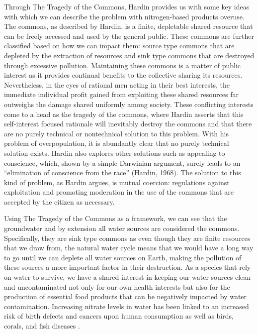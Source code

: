 \documentclass[12pt]{article}
\begin{document}
	Through The Tragedy of the Commons, Hardin provides us with some key ideas with which we can describe the problem with nitrogen-based products overuse. The commons, as described by Hardin, is a finite, depletable shared resource that can be freely accessed and used by the general public. These commons are further classified based on how we can impact them: source type commons that are depleted by the extraction of resources and sink type commons that are destroyed through excessive pollution. Maintaining these commons is a matter of public interest as it provides continual benefits to the collective sharing its resources. Nevertheless, in the eyes of rational men acting in their best interests, the immediate individual profit gained from exploiting these shared resources far outweighs the damage shared uniformly among society. These conflicting interests come to a head as the tragedy of the commons, where Hardin asserts that this self-interest focused rationale will inevitably destroy the commons and that there are no purely technical or nontechnical solution to this problem. With his problem of overpopulation, it is abundantly clear that no purely technical solution exists. Hardin also explores other solutions such as appealing to conscience, which, shown by a simple Darwinian argument, surely leads to an “elimination of conscience from the race” (Hardin, 1968). The solution to this kind of problem, as Hardin argues, is mutual coercion: regulations against exploitation and promoting moderation in the use of the commons that are accepted by the citizen as necessary. 
	
	Using The Tragedy of the Commons as a framework, we can see that the groundwater and by extension all water sources are considered the commons. Specifically, they are sink type commons as even though they are finite resources that we draw from, the natural water cycle means that we would have a long way to go until we can deplete all water sources on Earth, making the pollution of these sources a more important factor in their destruction. As a species that rely on water to survive, we have a shared interest in keeping our water sources clean and uncontaminated not only for our own health interests but also for the production of essential food products that can be negatively impacted by water contamination. Increasing nitrate levels in water has been linked to an increased risk of birth defects and cancers upon human consumption as well as birds, corals, and fish diseases \cite{issuesinecology}. 
	
\end{document}
